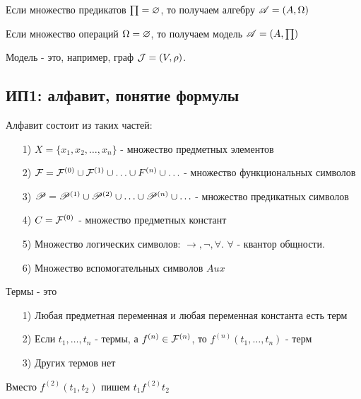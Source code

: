\medskip

Если множество предикатов $\prod = \varnothing$, то получаем алгебру  $\mathscr{A} = (A, \Omega)$ 

Если множество операций $\Omega = \varnothing$, то получаем модель  $\mathscr{A} = (A, \prod)$ 

\medskip

Модель - это, например, граф ${\cal J} = (V, \rho)$.

\subsection{ИП1: алфавит, понятие формулы}

\begin{definition}
    Алфавит состоит из таких частей:
\begin{itemize}
    \item[1)] $X = \{x_1,x_2,\ldots,x_{n}\} $ - множество предметных элементов
    \item[2)] ${\cal F} = {\cal F}^{(0)} \cup {\cal F}^{(1)} \cup \ldots \cup F^{(n)} \cup \ldots$ -
        множество функциональных символов
    \item[3)] $\mathscr{P} = \mathscr{P}^{(1)} \cup \mathscr{P}^{(2)} \cup \ldots \cup \mathscr{P}^{(n)} \cup \ldots$ 
        - множество предикатных символов
    \item[4)] $C = {\cal F}^{(0)}$ - множество предметных констант
    \item[5)] Множество логических символов:  $\to , \lnot, \forall $. $\forall $ - квантор
        общности.
    \item[6)] Множество вспомогательных символов $Aux$
\end{itemize}
\end{definition}

\begin{definition}
Термы - это
\begin{itemize}
    \item[1)] Любая предметная переменная и любая переменная константа есть терм
    \item[2)] Если $t_1,\ldots,t_n$ - термы, а $f^{(n)} \in {\cal F}^{(n)}$, то
        $f^{(n)}(t_1,\ldots,t_n)$ - терм
    \item[3)] Других термов нет
\end{itemize}

\end{definition}

Вместо $f^{(2)}(t_1,t_2)$ пишем $t_1f^{(2)}t_2$

